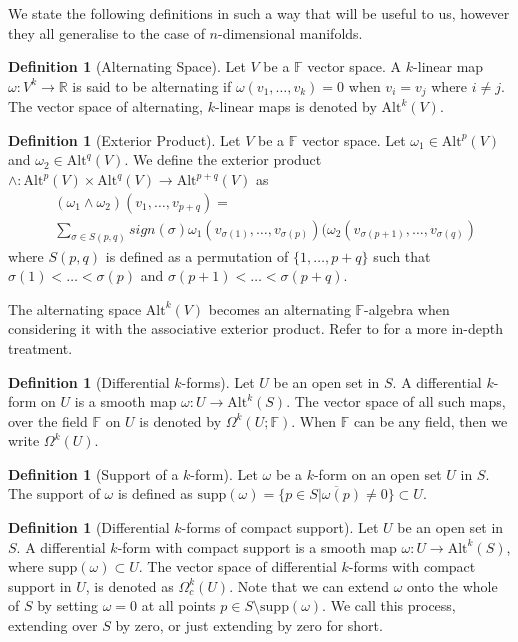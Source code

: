 \documentclass[11pt]{report}
\theoremstyle{definition}
\newtheorem{defn}[thm]{Definition}
\begin{document}
We state the following definitions in such a way that will be useful to us, however they all generalise to the case of $n$-dimensional manifolds.
\begin{defn}[Alternating Space]\label{AltSpc}
  Let $V$ be a $\mathbb{F}$ vector space. A $k$-linear map $\omega:V^k\rightarrow \mathbb{R}$ is said to be alternating if $\omega(v_1,\ldots,v_k)=0$ when $v_i=v_j$ where $i\neq j$. The vector space of alternating, $k$-linear maps is denoted by $\text{Alt}^k(V)$.
\end{defn}
\begin{defn}[Exterior Product]
  Let $V$ be a $\mathbb{F}$ vector space. Let $\omega_1 \in \text{Alt}^p(V)$ and $\omega_2 \in \text{Alt}^q(V)$. We define the exterior product $\wedge : \text{Alt}^p(V) \times \text{Alt}^q(V) \rightarrow \text{Alt}^{p+q}(V)$ as 
  \begin{align*}
    &(\omega_1 \wedge \omega_2)(v_1,\ldots,v_{p+q})= \\
    &\sum_{\sigma \in S(p,q)}sign(\sigma)\omega_1(v_{\sigma(1)},\ldots,v_{\sigma(p)})(\omega_2(v_{\sigma(p+1)},\ldots,v_{\sigma(q)})
  \end{align*}
  where $S(p,q)$ is defined as a permutation of $\{1,\ldots,p+q\}$ such that $\sigma(1) < \ldots < \sigma(p)$ and $\sigma(p+1) < \ldots < \sigma(p+q)$.
\end{defn}
The alternating space $\text{Alt}^k(V)$ becomes an alternating $\mathbb{F}$-algebra when considering it with the associative exterior product. Refer to \cite[p.11]{calcohomo} for a more in-depth treatment.

\begin{defn}[Differential $k$-forms]\label{k-form}
  Let $U$ be an open set in $S$. A differential $k$-form on $U$ is a smooth map $\omega : U \rightarrow \text{Alt}^k(S)$. The vector space of all such maps, over the field $\mathbb{F}$ on $U$ is denoted by $\Omega^k(U;\mathbb{F})$. When $\mathbb{F}$ can be any field, then we write $\Omega^k(U)$.
\end{defn}

\begin{defn}[Support of a $k$-form]
  Let $\omega$ be a $k$-form on an open set $U$ in $S$. The support of $\omega$ is defined as $\text{supp}(\omega) = \overline{\{p \in S \vert \omega(p) \neq 0\}} \subset U$.
\end{defn}

\begin{defn}[Differential $k$-forms of compact support]
  Let $U$ be an open set in $S$. A differential $k$-form with compact support is a smooth map $\omega : U \rightarrow \text{Alt}^k(S)$, where $\text{supp}(\omega) \subset U$. The vector space of differential $k$-forms with compact support in $U$, is denoted as $\Omega_c^k(U)$. Note that we can extend $\omega$ onto the whole of $S$ by setting $\omega = 0$ at all points $p \in S \setminus \text{supp}(\omega)$. We call this process, extending over $S$ by zero, or just extending by zero for short.
\end{defn}
\end{document}
